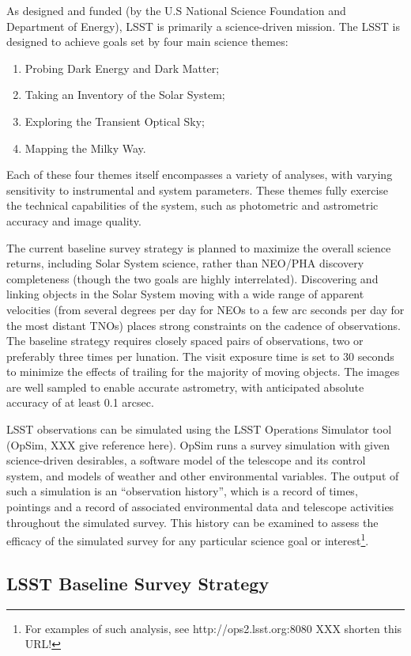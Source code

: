 As designed and funded (by the U.S National Science Foundation and
Department of Energy), LSST is primarily a science-driven mission. 
The LSST is designed to achieve goals set by four main science themes:
\begin{enumerate}
\item Probing Dark Energy and Dark Matter;
\item Taking an Inventory of the Solar System;
\item Exploring the Transient Optical Sky;
\item Mapping the Milky Way.
\end{enumerate}
Each of these four themes itself encompasses a variety of analyses, with 
varying sensitivity to instrumental and system parameters. These themes 
fully exercise the technical capabilities of the system, such as photometric 
and astrometric accuracy and image quality. 

The current baseline survey strategy is planned to maximize the overall science returns, including 
Solar System science, rather than NEO/PHA discovery completeness (though the 
two goals are highly interrelated). Discovering and linking objects in the Solar System 
moving with a wide range of apparent velocities (from several degrees per day for 
NEOs to a few arc seconds per day for the most distant TNOs) places strong 
constraints on the cadence of observations. The baseline strategy requires closely 
spaced pairs of observations, two or preferably three times per lunation. The visit
exposure time is set to 30 seconds to minimize the effects of trailing for the majority of 
moving objects. The images are well sampled to enable accurate astrometry, with 
anticipated absolute accuracy of at least 0.1 arcsec.

LSST observations can be simulated using the LSST Operations Simulator tool (OpSim, XXX give
reference here). OpSim runs a survey simulation with given science-driven desirables, 
a software model of the telescope and its control system, and models of weather and other 
environmental variables. The output of such a simulation is an ``observation history'', which 
is a record of times, pointings and a record of associated environmental data and telescope  
activities throughout the simulated survey.  This history can be examined to assess  
the efficacy of the simulated survey for any particular science goal or 
interest\footnote{For examples of such analysis, see http://ops2.lsst.org:8080 XXX shorten this URL!}. 


\subsection{LSST Baseline Survey Strategy}

